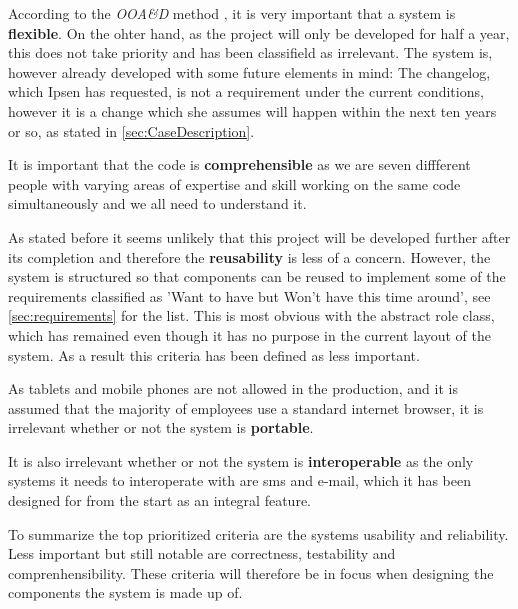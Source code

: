 \documentclass[../../master.tex]{subfiles}
\begin{document}
According to the \textit{OOA\&D} method \citep[p.~182]{Rod-Aalborg}, it is very important that a system is \textbf{flexible}.
On the ohter hand, as the project will only be developed for half a year, this does not take priority and has been classifield as irrelevant.
The system is, however already developed with some future elements in mind: The changelog, which Ipsen has requested, is not a requirement under the current conditions, however it is a change which she assumes will happen within the next ten years or so, as stated in \cref{sec:CaseDescription}.

It is important that the code is \textbf{comprehensible} as we are seven diffferent people with varying areas of expertise and skill working on the same code simultaneously and we all need to understand it.

As stated before it seems unlikely that this project will be developed further after its completion and therefore the \textbf{reusability} is less of a concern.
However, the system is structured so that components can be reused to implement some of the requirements classified as 'Want to have but Won't have this time around', see \cref{sec:requirements} for the list.
This is most obvious with the abstract role class, which has remained even though it has no purpose in the current layout of the system.
As a result this criteria has been defined as less important.

As tablets and mobile phones are not allowed in the production, and it is assumed that the majority of employees use a standard internet browser, it is irrelevant whether or not the system is \textbf{portable}.

It is also irrelevant whether or not the system is \textbf{interoperable} as the only systems it needs to interoperate with are sms and e-mail, which it has been designed for from the start as an integral feature.

To summarize the top prioritized criteria are the systems usability and reliability.
Less important but still notable are correctness, testability and comprenhensibility.
These criteria will therefore be in focus when designing the components the system is made up of.
\end{document}
